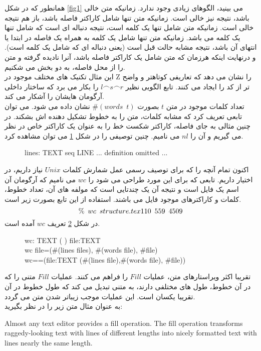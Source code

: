 همانطور که در شکل 
\ref{fig1}
می بینید، الگوهای زیادی وجود ندارد. زمانیکه متن خالی باشد، نتیجه نیز خالی است. زمانیکه متن تنها شامل کاراکتر فاصله باشد، باز هم نتیجه خالی است. زمانیکه متن شامل تنها یک کلمه است، نتیجه دنباله ای است که شامل تنها یک کلمه می باشد. زمانیکه متن تنها شامل یک کلمه به همراه یک فاصله در ابتدا یا انتهای آن باشد، نتیجه مشابه حالت قبل است (یعنی دنباله ای که شامل یک کلمه است). و درنهایت اینکه هرزمان که متن شامل یک کاراکتر فاصله باشد، آنرا نادیده گرفته و متن را از محل فاصله، به دو بخش می شکنیم.
\\
این مثال تکنیک های مختلف موجود در Z را نشان می دهد که تعاریفی کوتاهتر و واضح تر از کد را ایجاد می کنند. تابع الگویی نظیر 
$l\frown s \frown r$
را بکار می برد که ساختار داخلی آرگومان
 هایشان را آشکار می کند. 
 \\
 تعداد کلمات موجود در متن $t$ بصورت
 $\#(words \enspace t)$
 نشان داده می شود. می توان تابعی تعریف کرد که مشابه کلمات، متن را به خطوط تشکیل دهنده اش بشکند. در چنین مثالی به جای فاصله، کاراکتر شکست خط را به عنوان یک کاراکتر خاص در نظر می گیریم و آن را $nl$ می نامیم. چنین توصیفی را در شکل 
 \ref{fig2}
 می توان مشاهده کرد.
 \\
 \begin{figure}
\centering
\begin{axdef}
lines: TEXT \rightarrow seq \enspace LINE
\ST
... definition \enspace omitted ...
\end{axdef}
\caption{}
\label{fig2}
\end{figure}
اکنون تمام آنچه را که برای توصیف رسمی عمل شمارش کلمات 
$Unix$
نیاز داریم، در اختیار داریم. تابعی که برای این مورد طراحی می شود را $wc$ می نامیم که آرگومان آن اسم یک فایل است و نتیجه آن یک چندتایی است که مولفه های آن، تعداد خطوط، کلمات و کاراکترهای موجود فایل می باشند. استفاده از این تابع بصورت زیر است.
\[
\% \enspace wc \enspace structure.tex\\
110 \enspace 559 \enspace 4509
\]
در شکل
\ref{fig3}
 تعریف $wc$ آمده است.
 \begin{figure}
\centering
\begin{axdef}
wc: TEXT \rightarrow ( \times {} \times {})
\ST
\forall file:TEXT \bullet \\
wc \enspace file=(\#(lines \enspace files), \enspace \#(words \enspace file), \enspace \#file)\\
wc==(\lambda \enspace file:TEXT \bullet(\#(lines \enspace file),\enspace \#(words \enspace file), \enspace \#file))
\end{axdef}
\caption{}
\label{fig3}
\end{figure}
تقریبا اکثر ویراستارهای متن، عملیات $Fill$ را فراهم می کنند. عملیات $Fill$ متنی را که در آن خطوط، طول های مختلفی دارند، به متنی تبدیل می کند که طول خطوط در آن تقریبا یکسان است. این عملیات موجب زیباتر شدن متن می گردد.
\\
به عنوان مثال متن زیر را در نظر بگیرید:
\\
\begin{flushleft}
 
Almost any text editor provides a fill
operation. The fill operation transforms raggedy-looking text
with lines of
different lengths into nicely formatted text with lines
nearly the same length. 
\end{flushleft}

